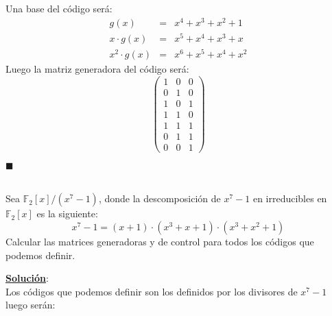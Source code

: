 Una base del c\'odigo ser\'a:
\begin{eqnarray*}
g(x)&=&x^4+x^3+x^2+1\\
x\cdot g(x)&=& x^5+x^4+x^3+x\\
x^2\cdot g(x)&=& x^6+x^5+x^4+x^2
\end{eqnarray*}
Luego la matriz generadora del c\'odigo ser\'a:
\begin{displaymath}
\left( \begin{array}{ccc}
1&0&0\\
0&1&0\\
1&0&1\\
1&1&0\\
1&1&1\\
0&1&1\\
0&0&1
\end{array} \right)
\end{displaymath}
\begin{flushright}
$\blacksquare$
\end{flushright}
%
\newpage 
%
\begin{ejercicio}
\ \\
Sea $\mathbb{F}_2[x]/(x^7-1)$, donde la descomposici\'on de $x^7-1$ en 
irreducibles en $\mathbb{F}_2[x]$ es la siguiente:
\begin{displaymath}
x^7-1=(x+1)\cdot(x^3+x+1)\cdot(x^3+x^2+1)
\end{displaymath}
Calcular las matrices generadoras y de control para todos los c\'odigos que
podemos definir.
\end{ejercicio}
\underline{\textbf{Soluci\'on}}:\\
Los c\'odigos que podemos definir son los definidos por los divisores de
$x^7-1$ luego ser\'an:

